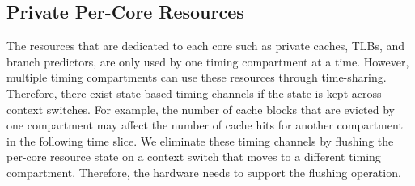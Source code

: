  
\subsection{Private Per-Core Resources}

The resources that are dedicated to each core such as private caches,
TLBs, and branch predictors, are only used by one timing compartment at a time.
However, multiple timing compartments can use these resources through 
time-sharing. Therefore, there exist state-based timing channels if the state 
is
kept across context switches. For example, the number of cache blocks that
are evicted by one compartment may affect the number of cache hits for
another compartment in the following time slice.
We eliminate these timing channels by flushing the per-core resource state on a 
context switch that moves to a different timing compartment.
Therefore, the hardware needs to support the flushing operation.



